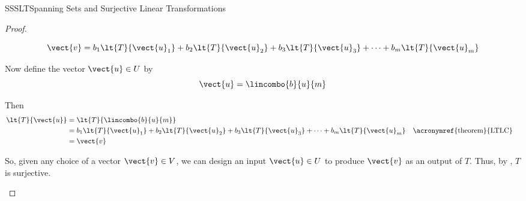 \begin{subsect}{SSSLT}{Spanning Sets and Surjective Linear Transformations}
\begin{proof}
\begin{para}
%
\begin{equation*}
\vect{v}=b_1\lt{T}{\vect{u}_1}+b_2\lt{T}{\vect{u}_2}+b_3\lt{T}{\vect{u}_3}+\cdots+b_m\lt{T}{\vect{u}_m}
\end{equation*}
\end{para}
%
\begin{para}Now define the vector $\vect{u}\in U$ by
%
\begin{equation*}
\vect{u}=\lincombo{b}{u}{m}
\end{equation*}
\end{para}
%
\begin{para}Then
%
\begin{align*}
\lt{T}{\vect{u}}&=\lt{T}{\lincombo{b}{u}{m}}\\
&=b_1\lt{T}{\vect{u}_1}+b_2\lt{T}{\vect{u}_2}+b_3\lt{T}{\vect{u}_3}+\cdots+b_m\lt{T}{\vect{u}_m}&&\text{\acronymref{theorem}{LTLC}}\\
&=\vect{v}
\end{align*}
\end{para}
%
\begin{para}So, given any choice of a vector $\vect{v}\in V$, we can design an input $\vect{u}\in U$ to produce $\vect{v}$ as an output of $T$.  Thus, by , $T$ is surjective.\end{para}
%
\end{proof}
%
\end{subsect}
%
